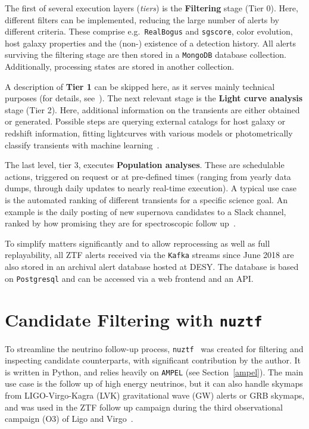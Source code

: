 The first of several execution layers (\textit{tiers}) is the \textbf{Filtering} stage (Tier 0). Here, different filters can be implemented, reducing the large number of alerts by different criteria. These comprise e.g.\ \texttt{RealBogus} and \texttt{sgscore}, color evolution, host galaxy properties and the (non-) existence of a detection history. All alerts surviving the filtering stage are then stored in a \texttt{MongoDB} database collection. Additionally, processing states are stored in another collection.

A description of \textbf{Tier 1} can be skipped here, as it serves mainly technical purposes (for details, see~\cite{Nordin2019}). The next relevant stage is the \textbf{Light curve analysis} stage (Tier 2). Here, additional information on the transients are either obtained or generated. Possible steps are querying external catalogs for host galaxy or redshift information, fitting lightcurves with various models or photometrically classify transients with machine learning~\cite{Nordin2019}.

The last level, tier 3, executes \textbf{Population analyses}. These are schedulable actions, triggered on request or at pre-defined times (ranging from yearly data dumps, through daily updates to nearly real-time execution). A typical use case is the automated ranking of different transients for a specific science goal. An example is the daily posting of new supernova candidates to a Slack channel, ranked by how promising they are for spectroscopic follow up~\cite{Nordin2019}.

To simplify matters significantly and to allow reprocessing as well as full replayability, all ZTF alerts received via the \texttt{Kafka} streams since June 2018 are also stored in an archival alert database hosted at DESY. The database is based on \texttt{Postgresql} and can be accessed via a web frontend and an API.

\section{Candidate Filtering with \texttt{nuztf}}
To streamline the neutrino follow-up process, \texttt{nuztf}~ was created for filtering and inspecting candidate counterparts, with significant contribution by the author. It is written in Python, and relies heavily on \texttt{AMPEL} (see Section~\ref{ampel}). The main use case is the follow up of high energy neutrinos, but it can also handle skymaps from LIGO-Virgo-Kagra (LVK) gravitational wave (GW) alerts or GRB skymaps, and was used in the ZTF follow up campaign during the third observational campaign (O3) of Ligo and Virgo~\cite{Kasliwal2020}.

